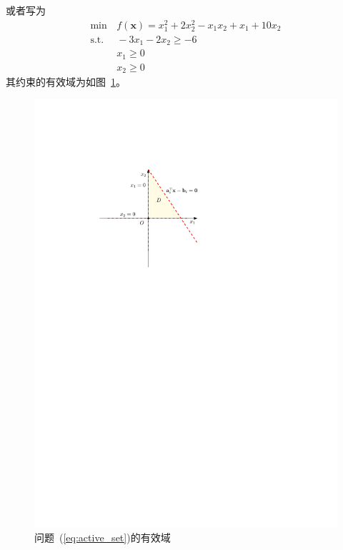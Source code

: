 或者写为
\begin{equation}\label{eq:active_set}
    \begin{aligned}
        \min &\, f(\boldsymbol{x}) = x_1^2+2x_2^2-x_1x_2+x_1+10x_2\\
        \operatorname*{s.t.} &\, -3x_1-2x_2\geqslant -6\\
        &\, x_1\geqslant 0\\
        &\, x_2\geqslant 0
    \end{aligned}
\end{equation}
其约束的有效域为如图~\ref{fig:D-active_set}。
\begin{figure}[htbp]
    \centering
    \includegraphics{image/active_set-image.pdf}
    \caption{问题~(\ref{eq:active_set})的有效域}
    \label{fig:D-active_set}
\end{figure}
